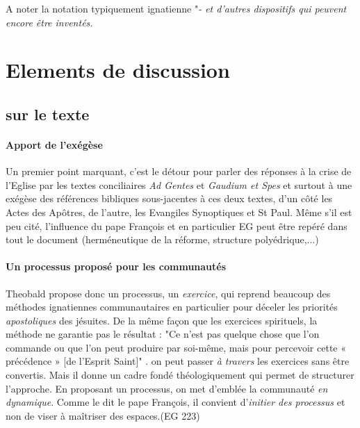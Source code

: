 A noter la notation typiquement ignatienne "\textit{- et d'autres dispositifs qui peuvent encore être inventés.} 
 
 
 

\section{ Elements de discussion}


\subsection{sur le texte}
\paragraph{Apport de l'exégèse} Un premier point marquant, c'est le détour pour parler des réponses à la crise de l'Eglise par les textes conciliaires \textit{Ad Gentes} et \textit{Gaudium et Spes} et surtout à une exégèse des références bibliques sous-jacentes à ces deux textes, d'un côté les Actes des Apôtres, de l'autre, les Evangiles Synoptiques et St Paul. Même s'il est peu cité, l'influence du pape François et en particulier EG peut être repéré dans tout le document (herméneutique de la réforme, structure polyédrique,...)



\paragraph{Un processus proposé pour les communautés } Theobald propose donc un processus, un \textit{exercice}, qui reprend beaucoup des méthodes ignatiennes communautaires en particulier pour déceler les priorités \textit{apostoliques} des jésuites.  De la même façon que les exercices spirituels, la méthode ne garantie pas le résultat : "Ce n'est pas quelque chose que l'on commande ou que l'on peut produire par soi-même, mais pour percevoir cette « précédence » [de l'Esprit Saint]" \cite[p. 460]{theobald_urgences_2017}. on peut passer \textit{à travers} les exercices sans être convertis. Mais il donne un cadre fondé théologiquement qui permet de structurer l'approche. En proposant un processus, on met d'emblée la communauté \textit{en dynamique}. Comme le dit le pape François, il convient d'\textit{initier des processus} et non de viser à maîtriser des espaces.(EG 223) 


